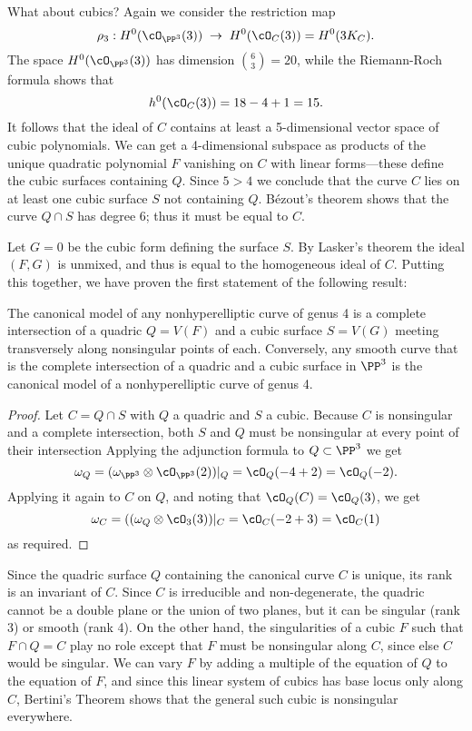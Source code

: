 What about cubics? Again we consider the restriction map
$$
\rho_3 : H^0(\cO_{\PP^3}(3)) \; \to \; H^0(\cO_{C}(3)) = H^0(3K_C).
$$
The space $H^0(\cO_{\PP^3}(3))$ has dimension $\binom{6}{3} = 20$, while  the Riemann-Roch formula shows that
$$
h^0(\cO_C(3)) = 18 - 4 + 1 = 15.
$$
It follows that the ideal of $C$ contains at least a 5-dimensional vector space of cubic polynomials. We can get a 4-dimensional subspace as products of the unique quadratic polynomial $F$ vanishing on $C$ with linear forms---these define the cubic surfaces containing $Q$. Since $5 > 4$ we  conclude that the curve $C$ lies on at least one cubic surface $S$  not containing $Q$. 
B\'ezout's theorem shows that the curve $Q \cap S$ has degree 6; thus it must be equal to $C$. 

Let $G=0$ be the cubic form defining the surface $S$. By Lasker's theorem the ideal $(F,G)$ is unmixed, and thus is equal to the homogeneous ideal of $C$. Putting this together, we have proven the first statement of the following result:

\begin{theorem}
The canonical model of any nonhyperelliptic curve of genus 4 is a complete intersection of a quadric $Q = V(F)$ and a cubic surface $S = V(G)$ meeting transversely along nonsingular points of each. Conversely, any smooth curve that is the complete intersection of a quadric and a cubic surface in $\PP^3$ is the canonical model of a nonhyperelliptic curve of genus 4.
\end{theorem}
 
\begin{proof}
Let $C = Q\cap S$ with $Q$ a quadric and $S$ a cubic. Because $C$ is nonsingular and a complete intersection, both $S$ and $Q$ must be nonsingular at every point of their intersection Applying the adjunction formula to $Q\subset \PP^3$ we get
$$
\omega_Q = (\omega_{\PP^3} \otimes \cO_{\PP^3}(2))|_Q = \cO_Q(-4+2) = \cO_Q(-2).
$$
Applying it again to $C$ on $Q$, and noting that $\cO_Q(C) = \cO_Q(3)$, we get
$$
\omega_C = ((\omega_{Q} \otimes \cO_{3}(3))|_C = \cO_C(-2+3) = \cO_C(1)
$$
as required. 
\end{proof}

Since the quadric surface $Q$ containing the canonical curve $C$  is unique, its rank is an invariant of $C$.
Since $C$ is irreducible and non-degenerate, the quadric cannot be a double plane or the union of two planes, but it can be singular (rank 3) or smooth (rank 4). On the other hand, the singularities of a cubic $F$ such that $F\cap Q = C$ play no role except that $F$ must be nonsingular along $C$, since else 
$C$ would be singular. We can vary $F$ by adding a multiple of the equation of $Q$ to the equation of $F$, and since this linear system of cubics has base locus only along $C$, Bertini's Theorem shows that the general such cubic is nonsingular everywhere.

